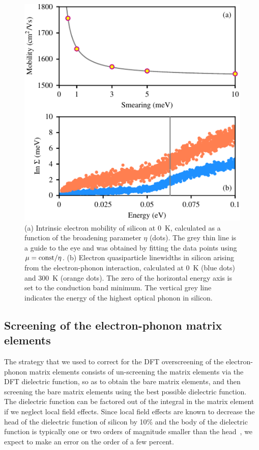 \documentclass[aps,prl,twocolumn,superscriptaddress]{revtex4-1}
\begin{document}
\begin{figure}
  \centering
  \includegraphics[width=\columnwidth]{figS2.pdf}
  \caption{\label{figS2}
  (a) Intrinsic electron mobility of silicon at 0~K, 
  calculated as a function of the broadening parameter $\eta$
  (dots). The grey thin line is a guide to the eye and was obtained by fitting the data points using
  $\mu = {\rm const}/ \eta$.
  (b) Electron quasiparticle linewidths in silicon arising from the electron-phonon interaction,
  calculated at 0~K (blue dots) and 300~K (orange dots). The zero of the horizontal energy axis is set
  to the conduction band minimum. The vertical grey line indicates the energy of the highest optical
  phonon in silicon.
  }
\end{figure}

\subsection{Screening of the electron-phonon matrix elements}

The strategy that we used to correct for the DFT overscreening of the electron-phonon matrix elements
consists of un-screening the matrix elements via the DFT dielectric function, so as to obtain
the bare matrix elements, and then screening the bare matrix elements using the best possible
dielectric function. The dielectric function can be factored out of the integral in the matrix element
if we neglect local field effects.
Since local field effects are known to decrease the head of the dielectric function of silicon by 10\%
and the body of the dielectric function 
is typically one or two orders of magnitude smaller than the head~\cite{Hybertsen1987}, we expect 
to make an error on the order of a few percent. 
\end{document}
